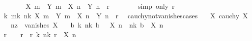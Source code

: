 \begin{isabellebody}
\ \ \ \ \isamarkupfalse%
\ \isamarkupfalse%
\ {\isachardoublequoteopen}{\isasymbar}X\ m\ {\isacharasterisk}{\kern0pt}\ Y\ m\ {\isacharminus}{\kern0pt}\ X\ n\ {\isacharasterisk}{\kern0pt}\ Y\ n{\isasymbar}\ {\isacharless}{\kern0pt}\ r{\isachardoublequoteclose}\isanewline
\ \ \ \ \ \ \isamarkupfalse%
\ {\isacharparenleft}{\kern0pt}simp\ only{\isacharcolon}{\kern0pt}\ r{\isacharparenright}{\kern0pt}\isanewline
\ \ \isamarkupfalse%
\isanewline
\ \ \isamarkupfalse%
\ \isamarkupfalse%
\ {\isachardoublequoteopen}{\isasymexists}k{\isachardot}{\kern0pt}\ {\isasymforall}m{\isasymge}k{\isachardot}{\kern0pt}\ {\isasymforall}n{\isasymge}k{\isachardot}{\kern0pt}\ {\isasymbar}X\ m\ {\isacharasterisk}{\kern0pt}\ Y\ m\ {\isacharminus}{\kern0pt}\ X\ n\ {\isacharasterisk}{\kern0pt}\ Y\ n{\isasymbar}\ {\isacharless}{\kern0pt}\ r{\isachardoublequoteclose}\ \isacommand{{\isachardot}{\kern0pt}{\isachardot}{\kern0pt}}\isamarkupfalse%
\isanewline
{}\isamarkupfalse%
%
\endisatagproof
{\isafoldproof}%
%
\isadelimproof
\isanewline
%
\endisadelimproof
\isanewline
{}\isamarkupfalse%
\ cauchy{\isacharunderscore}{\kern0pt}not{\isacharunderscore}{\kern0pt}vanishes{\isacharunderscore}{\kern0pt}cases{\isacharcolon}{\kern0pt}\isanewline
\ \ \ X{\isacharcolon}{\kern0pt}\ {\isachardoublequoteopen}cauchy\ X{\isachardoublequoteclose}\isanewline
\ \ \ nz{\isacharcolon}{\kern0pt}\ {\isachardoublequoteopen}{\isasymnot}\ vanishes\ X{\isachardoublequoteclose}\isanewline
\ \ \ {\isachardoublequoteopen}{\isasymexists}b{\isachargreater}{\kern0pt}{}{\isachardot}{\kern0pt}\ {\isasymexists}k{\isachardot}{\kern0pt}\ {\isacharparenleft}{\kern0pt}{\isasymforall}n{\isasymge}k{\isachardot}{\kern0pt}\ b\ {\isacharless}{\kern0pt}\ {\isacharminus}{\kern0pt}\ X\ n{\isacharparenright}{\kern0pt}\ {\isasymor}\ {\isacharparenleft}{\kern0pt}{\isasymforall}n{\isasymge}k{\isachardot}{\kern0pt}\ b\ {\isacharless}{\kern0pt}\ X\ n{\isacharparenright}{\kern0pt}{\isachardoublequoteclose}\isanewline
%
\isadelimproof
%
\endisadelimproof
%
\isatagproof
{}\isamarkupfalse%
\ {\isacharminus}{\kern0pt}\isanewline
\ \ \isamarkupfalse%
\ r\ \ {\isachardoublequoteopen}{}\ {\isacharless}{\kern0pt}\ r{\isachardoublequoteclose}\ \ r{\isacharcolon}{\kern0pt}\ {\isachardoublequoteopen}{\isasymforall}k{\isachardot}{\kern0pt}\ {\isasymexists}n{\isasymge}k{\isachardot}{\kern0pt}\ r\ {\isasymle}\ {\isasymbar}X\ n{\isasymbar}{\isachardoublequoteclose}\isanewline

\end{isabellebody}
